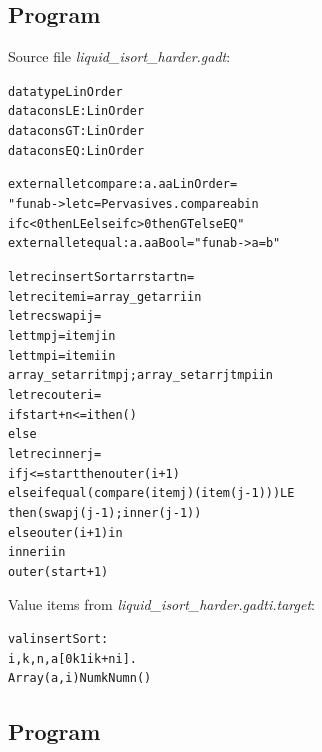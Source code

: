 \documentclass{article}
\newcommand{\tmem}[1]{{\em #1\/}}
\newcommand{\tmverbatim}[1]{{\ttfamily{#1}}}
\newenvironment{tmcode}[1][]{\begin{alltt}}{\end{alltt}}
\begin{document}
\subsection{Program \tmverbatim{isort}}

Source file {\tmem{liquid\_isort\_harder.gadt}}:
\begin{tmcode}
datatype LinOrder
datacons LE : LinOrder
datacons GT : LinOrder
datacons EQ : LinOrder

external let compare : a. a  a  LinOrder =
  "fun a b -> let c = Pervasives.compare a b in
              if c < 0 then LE else if c > 0 then GT else EQ"
external let equal : a. a  a  Bool = "fun a b -> a = b"

let rec insertSort arr start n =
  let rec item i = array_get arr i in
  let rec swap i j =
    let tmpj = item j in
    let tmpi = item i in
    array_set arr i tmpj; array_set arr j tmpi in
  let rec outer i =
    if start + n <= i then ()
    else
      let rec inner j =
        if j <= start then outer (i + 1)
        else if equal (compare (item j) (item (j - 1))) LE
        then (swap j (j - 1); inner (j - 1))
        else outer (i + 1) in
      inner i in
  outer (start + 1)
\end{tmcode}
Value items from {\tmem{liquid\_isort\_harder.gadti.target}}:
\begin{tmcode}
val insertSort :
   i, k, n, a[0  k  1  i  k + n  i].
   Array (a, i)  Num k  Num n  ()
\end{tmcode}

\subsection{Program \tmverbatim{tower}}
\end{document}
